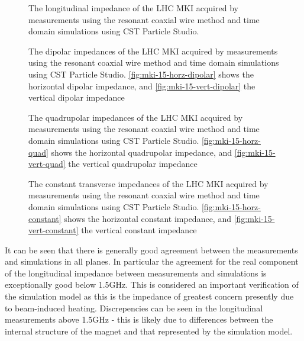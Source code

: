 \begin{figure}
\label{fig:mki-15-longitudinal}
\caption{The longitudinal impedance of the LHC MKI acquired by measurements using the resonant coaxial wire method and time domain simulations using CST Particle Studio.}
\end{figure}

\begin{figure}
\subfigure[]{
\label{fig:mki-15-horz-dipolar}
}
\subfigure[]{
\label{fig:mki-15-vert-dipolar}
}
\label{fig:mki-15-dipolar}
\caption{The dipolar impedances of the LHC MKI acquired by measurements using the resonant coaxial wire method and time domain simulations using CST Particle Studio. \ref{fig:mki-15-horz-dipolar} shows the horizontal dipolar impedance, and \ref{fig:mki-15-vert-dipolar} the vertical dipolar impedance}
\end{figure}

\begin{figure}
\subfigure[]{
\label{fig:mki-15-horz-quad}
}
\subfigure[]{
\label{fig:mki-15-vert-quad}
}
\label{fig:mki-15-quadrupolar}
\caption{The quadrupolar impedances of the LHC MKI acquired by measurements using the resonant coaxial wire method and time domain simulations using CST Particle Studio. \ref{fig:mki-15-horz-quad} shows the horizontal quadrupolar impedance, and \ref{fig:mki-15-vert-quad} the vertical quadrupolar impedance}
\end{figure}

\begin{figure}
\subfigure[]{
\label{fig:mki-15-horz-constant}
}
\subfigure[]{
\label{fig:mki-15-vert-constant}
}
\label{fig:mki-15-constant}
\caption{The constant transverse impedances of the LHC MKI acquired by measurements using the resonant coaxial wire method and time domain simulations using CST Particle Studio. \ref{fig:mki-15-horz-constant} shows the horizontal constant impedance, and \ref{fig:mki-15-vert-constant} the vertical constant impedance}
\end{figure}


It can be seen that there is generally good agreement between the measurements and simulations in all planes. In particular the agreement for the real component of the longitudinal impedance between measurements and simulations is exceptionally good below 1.5GHz. This is considered an important verification of the simulation model as this is the impedance of greatest concern presently due to beam-induced heating. Discrepencies can be seen in the longitudinal measurements above 1.5GHz - this is likely due to differences between the internal structure of the magnet and that represented by the simulation model.

